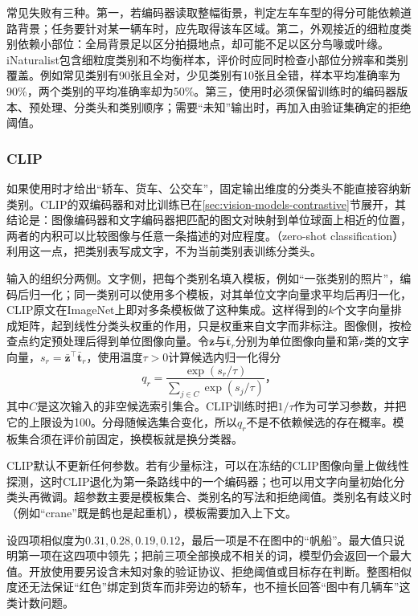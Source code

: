 常见失败有三种。第一，若编码器读取整幅街景，判定左车车型的得分可能依赖道路背景；任务要针对某一辆车时，应先取得该车区域。第二，外观接近的细粒度类别依赖小部位：全局背景足以区分拍摄地点，却可能不足以区分鸟喙或叶缘。iNaturalist包含细粒度类别和不均衡样本，评价时应同时检查小部位分辨率和类别覆盖。例如常见类别有90张且全对，少见类别有10张且全错，样本平均准确率为90\%，两个类别的平均准确率却为50\%。第三，使用时必须保留训练时的编码器版本、预处理、分类头和类别顺序；需要“未知”输出时，再加入由验证集确定的拒绝阈值。

\subsubsection{CLIP}
\label{sec:vision-recognition-clip}

如果使用时才给出“轿车、货车、公交车”，固定输出维度的分类头不能直接容纳新类别。CLIP的双编码器和对比训练已在\ref{sec:vision-models-contrastive}节展开，其结论是：图像编码器和文字编码器把匹配的图文对映射到单位球面上相近的位置，两者的内积可以比较图像与任意一条描述的对应程度。（zero-shot classification）利用这一点，把类别表写成文字，不为当前类别表训练分类头。

输入的组织分两侧。文字侧，把每个类别名填入模板，例如“一张{类别}的照片”，编码后归一化；同一类别可以使用多个模板，对其单位文字向量求平均后再归一化，CLIP原文在ImageNet上即对多条模板做了这种集成。这样得到的$k$个文字向量排成矩阵，起到线性分类头权重的作用，只是权重来自文字而非标注。图像侧，按检查点约定预处理后得到单位图像向量。令$\bar{\bm{z}}$与$\bar{\bm{t}}_r$分别为单位图像向量和第$r$类的文字向量，$s_r=\bar{\bm{z}}^\top\bar{\bm{t}}_r$，使用温度$\tau>0$计算候选内归一化得分
\begin{equation}
 q_r=\frac{\exp(s_r/\tau)}
 {\sum_{j\in C}\exp(s_j/\tau)}\text{，}
 \label{eq:vision-clip-classification}
\end{equation}
其中$C$是这次输入的非空候选索引集合。CLIP训练时把$1/\tau$作为可学习参数，并把它的上限设为100。分母随候选集合变化，所以$q_r$不是不依赖候选的存在概率。模板集合须在评价前固定，换模板就是换分类器。

CLIP默认不更新任何参数。若有少量标注，可以在冻结的CLIP图像向量上做线性探测，这时CLIP退化为第一条路线中的一个编码器；也可以用文字向量初始化分类头再微调。超参数主要是模板集合、类别名的写法和拒绝阈值。类别名有歧义时（例如“crane”既是鹤也是起重机），模板需要加入上下文。

设四项相似度为$0.31,0.28,0.19,0.12$，最后一项是不在图中的“帆船”。最大值只说明第一项在这四项中领先；把前三项全部换成不相关的词，模型仍会返回一个最大值。开放使用要另设含未知对象的验证协议、拒绝阈值或目标存在判断。整图相似度还无法保证“红色”绑定到货车而非旁边的轿车，也不擅长回答“图中有几辆车”这类计数问题。

